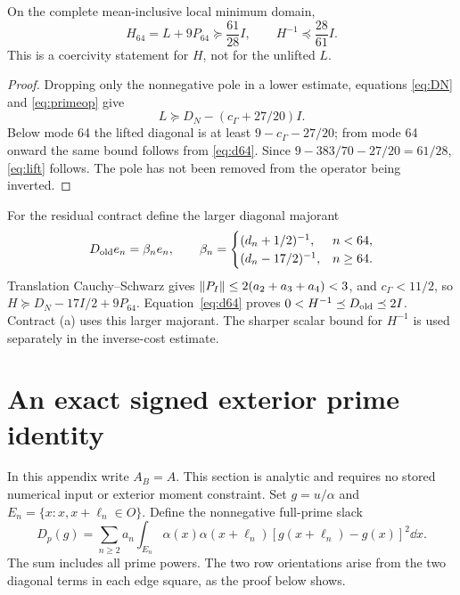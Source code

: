 \begin{theorem}\label{thm:lift}
On the complete mean-inclusive local minimum domain,
\begin{equation}\label{eq:lift}
 H_{64}=L+9P_{64}\succeq\frac{61}{28}I,
 \qquad H^{-1}\preceq\frac{28}{61}I.
\end{equation}
This is a coercivity statement for $H$, not for the unlifted $L$.
\end{theorem}
\begin{proof}
Dropping only the nonnegative pole in a lower estimate, equations
\eqref{eq:DN} and \eqref{eq:primeop} give
\[
 L\succeq D_N-(c_\Gamma+27/20)I.
\]
Below mode 64 the lifted diagonal is at least $9-c_\Gamma-27/20$;
from mode 64 onward the same bound follows from \eqref{eq:d64}.
Since $9-383/70-27/20=61/28$, \eqref{eq:lift} follows.
The pole has not been removed from the operator being inverted.
\end{proof}
For the residual contract define the larger diagonal majorant
\begin{equation}\label{eq:Dold}
 D_{\rm old}e_n=\beta_ne_n,\qquad
 \beta_n=\begin{cases}(d_n+1/2)^{-1},&n<64,\\
 (d_n-17/2)^{-1},&n\ge64.
 \end{cases}
\end{equation}
Translation Cauchy--Schwarz gives
$\lVert P_I\rVert\le2(a_2+a_3+a_4)<3$, and
$c_\Gamma<11/2$, so $H\succeq D_N-17I/2+9P_{64}$.
Equation~\eqref{eq:d64} proves
$0<H^{-1}\preceq D_{\rm old}\preceq2I$.
Contract (a) uses this larger majorant. The sharper scalar bound for $H^{-1}$ is used separately in the inverse-cost estimate.

\section{An exact signed exterior prime identity}\label{sec:signed}
In this appendix write $A_B=A$.
This section is analytic and requires no stored numerical input or
exterior moment constraint. Set $g=u/\alpha$ and
$E_n=\{x:x,x+\ell_n\in O\}$. Define the nonnegative full-prime slack
\begin{equation}\label{eq:slack}
 D_p(g)=\sum_{n\ge2}a_n\int_{E_n}
 \alpha(x)\alpha(x+\ell_n)[g(x+\ell_n)-g(x)]^2\dd x.
\end{equation}
The sum includes all prime powers. The two row orientations arise from
the two diagonal terms in each edge square, as the proof below shows.

